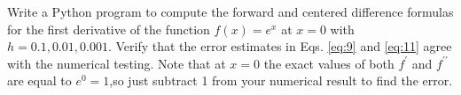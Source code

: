 \begin{problem} \label{P1.5}
Write a Python program to compute the forward and centered difference formulas for the first derivative of the function $f(x) = e^x $ at $x = 0$ with $h = 0.1, 0.01, 0.001$. Verify that the error estimates in Eqs. \eqref{eq:9} and \eqref{eq:11} agree with the numerical testing. Note that at $x =0$ the exact values of both $f^\prime$ and $f^{\prime\prime}$ are equal to $e^0 = 1$,so just subtract 1 from your numerical result to find the error.

\end{problem}

